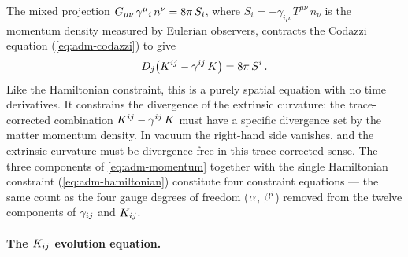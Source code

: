 The mixed projection $G_{\mu\nu}\,\gamma^{\mu}{}_i\,n^\nu = 8\pi\,S_i$,
where $S_i = -\gamma_{i\mu}\,T^{\mu\nu}\,n_\nu$ is the momentum density
measured by Eulerian observers, contracts the Codazzi equation
(\cref{eq:adm-codazzi}) to give
%
\begin{equation}
  D_j\bigl(K^{ij} - \gamma^{ij}\,K\bigr) = 8\pi\,S^i \,.
  \label{eq:adm-momentum}
\end{equation}
%
Like the Hamiltonian constraint, this is a purely spatial equation with no
time derivatives.  It constrains the divergence of the extrinsic curvature:
the trace-corrected combination
$K^{ij} - \gamma^{ij}\,K$ must have a specific divergence
set by the matter momentum density.  In vacuum the right-hand side
vanishes, and the extrinsic curvature must be divergence-free in this
trace-corrected sense.  The three components of \cref{eq:adm-momentum}
together with the single Hamiltonian constraint
(\cref{eq:adm-hamiltonian}) constitute four constraint equations --- the
same count as the four gauge degrees of freedom ($\alpha$, $\beta^{i}$)
removed from the twelve components of $\gamma_{ij}$ and $K_{ij}$.

\paragraph{The $K_{ij}$ evolution equation.}

